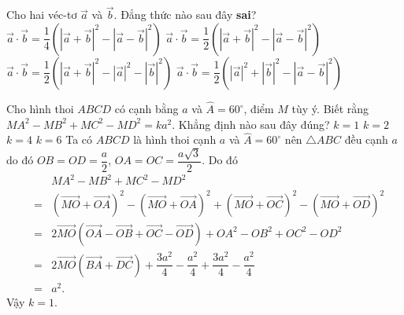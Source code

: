 \begin{ex}%
	Cho hai véc-tơ $\overrightarrow{a}$ và $\overrightarrow{b}$. Đẳng thức nào sau đây \textbf{sai}?
	\choice
	{$\overrightarrow{a}\cdot\overrightarrow{b}=\dfrac{1}{4}\left(\left|\overrightarrow{a}+\overrightarrow{b}\right|^2-\left|\overrightarrow{a}-\overrightarrow{b}\right|^2\right)$}
	{\True $\overrightarrow{a}\cdot\overrightarrow{b}=\dfrac{1}{2}\left(\left|\overrightarrow{a}+\overrightarrow{b}\right|^2-\left|\overrightarrow{a}-\overrightarrow{b}\right|^2\right)$}
	{$\overrightarrow{a}\cdot\overrightarrow{b}=\dfrac{1}{2}\left(\left|\overrightarrow{a}+\overrightarrow{b}\right|^2-\left|\overrightarrow{a}\right|^2-\left|\overrightarrow{b}\right|^2\right)$}
	{$\overrightarrow{a}\cdot\overrightarrow{b}=\dfrac{1}{2}\left(\left|\overrightarrow{a}\right|^2+\left|\overrightarrow{b}\right|^2-\left|\overrightarrow{a}-\overrightarrow{b}\right|^2\right)$}
\end{ex}

\begin{ex}%
	Cho hình thoi $ABCD$ có cạnh bằng $a$ và $\widehat{A}=60^\circ$, điểm $M$ tùy ý. Biết rằng 
	$MA^2-MB^2+MC^2-MD^2=ka^2$. Khẳng định nào sau đây đúng?
	\choice
	{\True $k=1$}
	{$k=2$}
	{$k=4$}
	{$k=6$}
	\loigiai
	{
		Ta có $ABCD$ là hình thoi cạnh $a$ và $\widehat{A}=60^\circ$ nên $\triangle ABC$ đều cạnh $a$ do đó $OB=OD=\dfrac{a}{2}$, $OA=OC=\dfrac{a\sqrt{3}}{2}$. Do đó
		\begin{eqnarray*}
			&& MA^2-MB^2+MC^2-MD^2\\
			& = & \left(\overrightarrow{MO}+\overrightarrow{OA}\right)^2-\left(\overrightarrow{MO}+\overrightarrow{OA}\right)^2+\left(\overrightarrow{MO}+\overrightarrow{OC}\right)^2-\left(\overrightarrow{MO}+\overrightarrow{OD}\right)^2\\
			& = & 2\overrightarrow{MO}\left(\overrightarrow{OA}-\overrightarrow{OB}+\overrightarrow{OC}-\overrightarrow{OD}\right)+OA^2-OB^2+OC^2-OD^2\\
			& = & 2\overrightarrow{MO}\left(\overrightarrow{BA}+\overrightarrow{DC}\right)+\dfrac{3a^2}{4}-\dfrac{a^2}{4}+\dfrac{3a^2}{4}-\dfrac{a^2}{4}\\
			& = & a^2.
		\end{eqnarray*}
		Vậy $k=1$.
	}
\end{ex}

